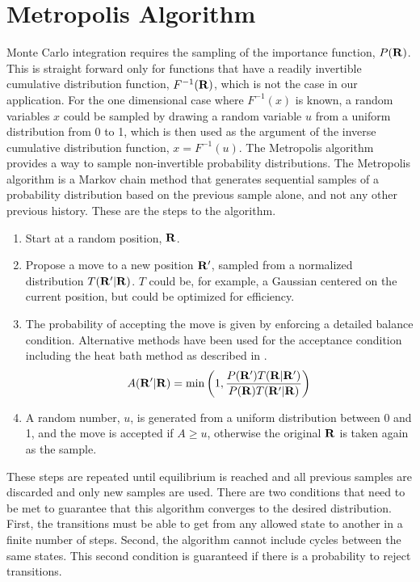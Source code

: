 \section{Metropolis Algorithm}
Monte Carlo integration requires the sampling of the importance function, $P(\mathbf{R})$. This is straight forward only for functions that have a readily invertible cumulative distribution function, $F^{-1}(\mathbf{R})$, which is not the case in our application. For the one dimensional case where $F^{-1}(x)$ is known, a random variables $x$ could be sampled by drawing a random variable $u$ from a uniform distribution from 0 to 1, which is then used as the argument of the inverse cumulative distribution function, $x=F^{-1}(u)$. The Metropolis algorithm provides a way to sample non-invertible probability distributions. The Metropolis algorithm is a Markov chain method that generates sequential samples of a probability distribution based on the previous sample alone, and not any other previous history. These are the steps to the algorithm.
\begin{enumerate}
   \item Start at a random position, $\mathbf{R}$.
   \item Propose a move to a new position $\mathbf{R}'$, sampled from a normalized distribution $T(\mathbf{R}'|\mathbf{R})$. $T$ could be, for example, a Gaussian centered on the current position, but could be optimized for efficiency.
   \item The probability of accepting the move is given by enforcing a detailed balance condition. Alternative methods have been used for the acceptance condition including the heat bath method as described in \cite{sethna2006}.
   \begin{equation}
      A(\mathbf{R}'|\mathbf{R}) = \mathrm{min}\left(1, \frac{P(\mathbf{R}')T(\mathbf{R}|\mathbf{R}')}{P(\mathbf{R})T(\mathbf{R}'|\mathbf{R})}\right)
   \end{equation}
   \item A random number, $u$, is generated from a uniform distribution between 0 and 1, and the move is accepted if $A\ge u$, otherwise the original $\mathbf{R}$ is taken again as the sample.
\end{enumerate}

These steps are repeated until equilibrium is reached and all previous samples are discarded and only new samples are used. There are two conditions that need to be met to guarantee that this algorithm converges to the desired distribution. First, the transitions must be able to get from any allowed state to another in a finite number of steps. Second, the algorithm cannot include cycles between the same states. This second condition is guaranteed if there is a probability to reject transitions.

